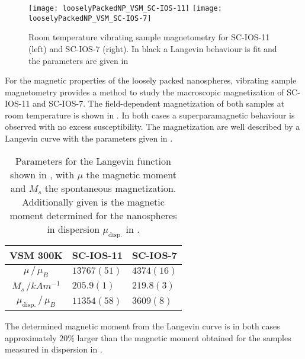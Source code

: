 \documentclass[\main/dresen_thesis.tex]{subfiles}
\begin{document}
  \label{sec:looselyPackedNS:layer:vsm}
  \begin{figure}[tb]
    \centering
    \texttt{[image: looselyPackedNP\_VSM\_SC-IOS-11]}
    \texttt{[image: looselyPackedNP\_VSM\_SC-IOS-7]}
    \caption{\label{fig:looselyPackedNP:layer:vsm}Room temperature vibrating sample magnetometry for SC-IOS-11 (left) and SC-IOS-7 (right). In black a Langevin behaviour is fit and the parameters are given in }
  \end{figure}

  For the magnetic properties of the loosely packed nanospheres, vibrating sample magnetometry provides a method to study the macroscopic magnetization of SC-IOS-11 and SC-IOS-7.
  The field-dependent magnetization of both samples at room temperature is shown in .
  In both cases a superparamagnetic behaviour is observed with no excess susceptibility.
  The magnetization are well described by a Langevin curve with the parameters given in .

  \begin{table}[!htbp]
    \centering
    \caption{\label{tab:looselyPackedNP:layer:vsm}Parameters for the Langevin function shown in , with $\mu$ the magnetic moment and $M_s$ the spontaneous magnetization. Additionally given is the magnetic moment determined for the nanospheres in dispersion $\mu_\mathrm{disp.}$ in .}
    \begin{tabular}{ c | l | l }
      \rule{0pt}{2ex} \textbf{VSM \@ 300K} & SC-IOS-11 & SC-IOS-7 \\
      \hline
      \rule{0pt}{2ex} $\mu \, / \, \mu_B$           & $13767(51)$   & $4374(16)$\\
      \rule{0pt}{2ex} $M_s \, /  \unit{kAm^{-1}}$   & $205.9(1)$    & $219.8(3)$\\
      \hline
      $\mu_\mathrm{disp.} \, / \, \mu_B$            & $11354(58)$   & $3609(8)$\\
      \hline
    \end{tabular}
  \end{table}
  The determined magnetic moment from the Langevin curve is in both cases approximately $20 \%$ larger than the magnetic moment obtained for the samples measured in dispersion in .
\end{document}
